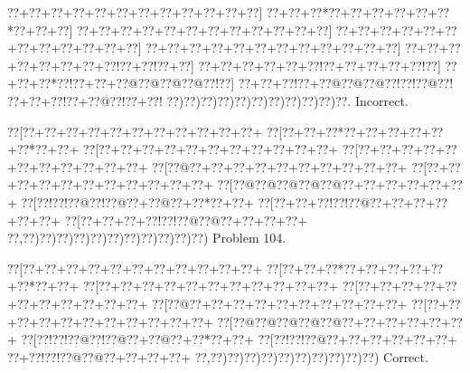 \documentclass[a5paper]{article}
\begin{document}
\begin{center}
{\goo
\0??+\0??+\0??+\0??+\0??+\0??+\0??+\0??+\0??+\0??+\0??+\0??]
\0??+\0??+\0??*\0??+\0??+\0??+\0??+\0??+\0??*\0??+\0??+\0??]
\0??+\0??+\0??+\0??+\0??+\0??+\0??+\0??+\0??+\0??+\0??+\0??]
\0??+\0??+\0??+\0??+\0??+\0??+\0??+\0??+\0??+\0??+\0??+\0??]
\0??+\0??+\0??+\0??+\0??+\0??+\0??+\0??+\0??+\0??+\0??+\0??]
\0??+\0??+\0??+\0??+\0??+\0??+\0??+\0??!\0??+\0??!\0??+\0??]
\0??+\0??+\0??+\0??+\0??+\0??!\0??+\0??+\0??+\0??+\0??!\0??]
\0??+\0??+\0??*\0??!\0??+\0??+\0??@\0??@\0??@\0??@\0??!\0??]
\0??+\0??+\0??!\0??+\0??@\0??@\0??@\0??!\0??!\0??@\0??!
\0??+\0??+\0??!\0??+\0??@\0??!\0??+\0??!
\0??)\0??)\0??)\0??)\0??)\0??)\0??)\0??)\0??)\0??)\0??.
}
Incorrect. 

\end{center}
\newpage
\begin{center}
{\goo
\0??[\0??+\0??+\0??+\0??+\0??+\0??+\0??+\0??+\0??+\0??+\0??+
\0??[\0??+\0??+\0??*\0??+\0??+\0??+\0??+\0??+\0??*\0??+\0??+
\0??[\0??+\0??+\0??+\0??+\0??+\0??+\0??+\0??+\0??+\0??+\0??+
\0??[\0??+\0??+\0??+\0??+\0??+\0??+\0??+\0??+\0??+\0??+\0??+
\0??[\0??@\0??+\0??+\0??+\0??+\0??+\0??+\0??+\0??+\0??+\0??+
\0??[\0??+\0??+\0??+\0??+\0??+\0??+\0??+\0??+\0??+\0??+\0??+
\0??[\0??@\0??@\0??@\0??@\0??@\0??+\0??+\0??+\0??+\0??+\0??+
\0??[\0??!\0??!\0??@\0??!\0??@\0??+\0??@\0??+\0??*\0??+\0??+
\0??[\0??+\0??+\0??!\0??!\0??@\0??+\0??+\0??+\0??+\0??+\0??+
\0??[\0??+\0??+\0??+\0??!\0??!\0??@\0??@\0??+\0??+\0??+\0??+
\0??,\0??)\0??)\0??)\0??)\0??)\0??)\0??)\0??)\0??)\0??)\0??)
}
Problem 104.

\end{center}
\begin{center}
{\goo
\0??[\0??+\0??+\0??+\0??+\0??+\0??+\0??+\0??+\0??+\0??+\0??+
\0??[\0??+\0??+\0??*\0??+\0??+\0??+\0??+\0??+\0??*\0??+\0??+
\0??[\0??+\0??+\0??+\0??+\0??+\0??+\0??+\0??+\0??+\0??+\0??+
\0??[\0??+\0??+\0??+\0??+\0??+\0??+\0??+\0??+\0??+\0??+\0??+
\0??[\0??@\0??+\0??+\0??+\0??+\0??+\0??+\0??+\0??+\0??+\0??+
\0??[\0??+\0??+\0??+\0??+\0??+\0??+\0??+\0??+\0??+\0??+\0??+
\0??[\0??@\0??@\0??@\0??@\0??@\0??+\0??+\0??+\0??+\0??+\0??+
\0??[\0??!\0??!\0??@\0??!\0??@\0??+\0??@\0??+\0??*\0??+\0??+
\0??[\0??!\0??!\0??@\0??+\0??+\0??+\0??+\0??+\0??+
\0??+\0??!\0??!\0??@\0??@\0??+\0??+\0??+\0??+
\0??,\0??)\0??)\0??)\0??)\0??)\0??)\0??)\0??)\0??)\0??)
}
Correct. 

\end{center}
\end{document}
